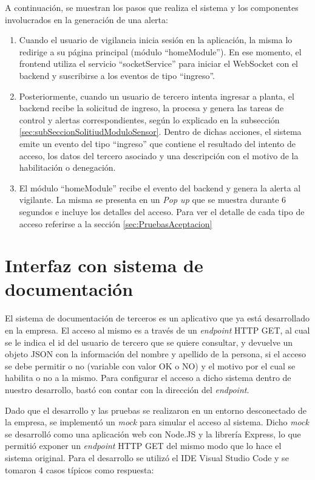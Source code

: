 A continuación, se muestran los pasos que realiza el sistema y los componentes involucrados en la generación de una alerta:
\begin{enumerate}
\item Cuando el usuario de vigilancia inicia sesión en la aplicación, la misma lo redirige a su página principal (módulo ``homeModule''). En ese momento, el frontend utiliza el servicio ``socketService'' para iniciar el WebSocket con el backend y suscribirse a los eventos de tipo ``ingreso''.
\item Posteriormente, cuando un usuario de tercero intenta ingresar a planta, el backend recibe la solicitud de ingreso, la procesa y genera las tareas de control y alertas correspondientes, según lo explicado en la subsección \ref{sec:subSeccionSolitiudModuloSensor}. Dentro de dichas acciones, el sistema emite un evento del tipo ``ingreso'' que contiene el resultado del intento de acceso, los datos del tercero asociado y una descripción con el motivo de la habilitación o denegación.
\item El módulo ``homeModule'' recibe el evento del backend y genera la alerta al vigilante. La misma se presenta en un \textit{Pop up} que se muestra durante 6 segundos e incluye los detalles del acceso. Para ver el detalle de cada tipo de acceso referirse a la sección \ref{sec:PruebasAceptacion}
\end{enumerate}


\section{Interfaz con sistema de documentación}

El sistema de documentación de terceros es un aplicativo que ya está desarrollado en la empresa. El acceso al mismo es a través de un \textit{endpoint} HTTP GET, al cual se le indica el id del usuario de tercero que se quiere consultar, y devuelve un objeto JSON con la información del nombre y apellido de la persona, si el acceso se debe permitir o no (variable con valor OK o NO) y el motivo por el cual se habilita o no a la mismo. Para configurar el acceso a dicho sistema dentro de nuestro desarrollo, bastó con contar con la dirección del \textit{endpoint}. 

Dado que el desarrollo y las pruebas se realizaron en un entorno desconectado de la empresa, se implementó un \textit{mock} para simular el acceso al sistema. Dicho \textit{mock} se desarrolló como una aplicación web con Node.JS y la librería Express, lo que permitió exponer un \textit{endpoint} HTTP GET del mismo modo que lo hace el sistema original. Para el desarrollo se utilizó el IDE Visual Studio Code y se tomaron 4 casos típicos como respuesta:


